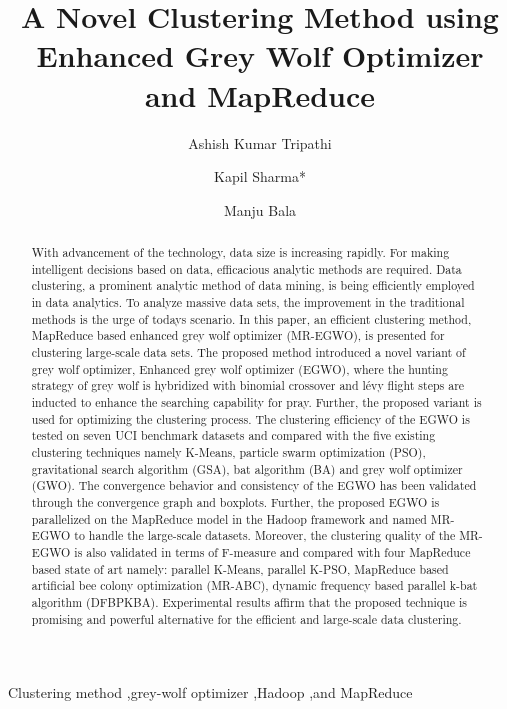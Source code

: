 \documentclass[review]{elsarticle}
\begin{document}
\begin{frontmatter}

\title{A Novel Clustering Method using Enhanced Grey Wolf Optimizer and MapReduce}

\author{Ashish Kumar Tripathi}

\author{Kapil Sharma*}
\author{Manju Bala}
\begin{abstract}
 With advancement of the technology, data size is increasing rapidly. For making intelligent decisions based on data, efficacious analytic methods are required. Data clustering, a prominent analytic method of data mining, is being efficiently employed in data analytics. To analyze massive data sets, the improvement in the traditional methods is the urge of todays scenario. 
 In this paper, an efficient clustering method, MapReduce based enhanced grey wolf optimizer (MR-EGWO), is presented for clustering large-scale data sets. The proposed method introduced a novel variant of grey wolf optimizer, Enhanced grey wolf optimizer (EGWO), where the hunting strategy of grey wolf is hybridized with binomial crossover and l\'{e}vy flight steps are inducted to enhance the searching capability for pray. Further, the proposed variant is used for optimizing the clustering process. The clustering efficiency of the EGWO is tested on seven UCI benchmark datasets and compared with the five existing clustering techniques namely K-Means, particle swarm optimization (PSO), gravitational search algorithm (GSA), bat  algorithm (BA) and grey wolf optimizer (GWO). The convergence behavior and consistency of the EGWO has been validated through the convergence graph and boxplots. Further, the proposed EGWO is parallelized on the MapReduce model in the Hadoop framework and named MR-EGWO to handle the large-scale datasets. Moreover, the clustering quality of the MR-EGWO is also validated in terms of F-measure and compared with four MapReduce based state of art namely: parallel K-Means, parallel K-PSO, MapReduce based artificial bee colony optimization (MR-ABC), dynamic frequency based parallel k-bat algorithm (DFBPKBA). Experimental results affirm that the proposed technique is promising and powerful alternative for the efficient and large-scale data clustering.
\end{abstract}

\begin{keyword}
Clustering method  \sep grey-wolf optimizer \sep Hadoop \sep and MapReduce 
\end{keyword}

\end{frontmatter}
\end{document}
